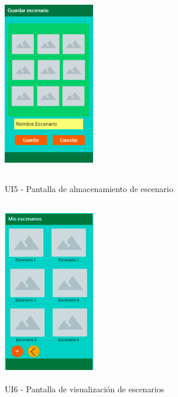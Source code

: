 \begin{figure}[h!]
	\begin{minipage}{0.48\textwidth}
		\centering
		\includegraphics[width=4cm,height=8cm]{imagenes/Anexos/Mockup/5-GuardarEscenario.PNG}
		\caption{UI5 - Pantalla de almacenamiento de escenario}
		\label{fig:analogo}
	\end{minipage}\hfill
	\begin{minipage}{0.48\textwidth}
		\centering
		\includegraphics[width=4cm,height=8cm]{imagenes/Anexos/Mockup/6-MisEscenarios.PNG}
		\caption{UI6 - Pantalla de visualización de escenarios }
		\label{fig:analogo}
	\end{minipage}\hfill
\end{figure}

